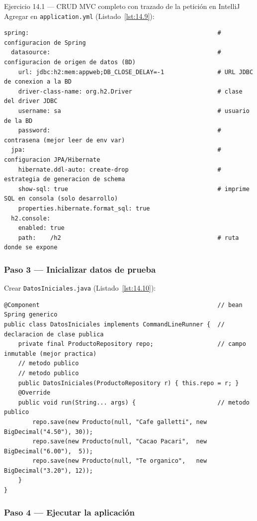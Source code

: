 \documentclass[11pt,a4paper,openany]{book}
\begin{document}
\begin{cajaejercicio}{Ejercicio 14.1 --- CRUD MVC completo con trazado de la petición en IntelliJ}
Agregar en \texttt{application.yml} (Listado~\ref{lst:14.9}):
\begin{lstlisting}[style=yaml,numbers=none,caption={Ejemplo de YAML},label=lst:14.9]
spring:                                                     # configuracion de Spring
  datasource:                                               # configuracion de origen de datos (BD)
    url: jdbc:h2:mem:appweb;DB_CLOSE_DELAY=-1               # URL JDBC de conexion a la BD
    driver-class-name: org.h2.Driver                        # clase del driver JDBC
    username: sa                                            # usuario de la BD
    password:                                               # contrasena (mejor leer de env var)
  jpa:                                                      # configuracion JPA/Hibernate
    hibernate.ddl-auto: create-drop                         # estrategia de generacion de schema
    show-sql: true                                          # imprime SQL en consola (solo desarrollo)
    properties.hibernate.format_sql: true
  h2.console:
    enabled: true
    path:    /h2                                            # ruta donde se expone
\end{lstlisting}

\subsubsection*{Paso 3 --- Inicializar datos de prueba}

Crear \texttt{DatosIniciales.java} (Listado~\ref{lst:14.10}):
\begin{lstlisting}[style=java,numbers=none,caption={Ejemplo de Java},label=lst:14.10]
@Component                                                  // bean Spring generico
public class DatosIniciales implements CommandLineRunner {  // declaracion de clase publica
    private final ProductoRepository repo;                  // campo inmutable (mejor practica)
    // metodo publico
    // metodo publico
    public DatosIniciales(ProductoRepository r) { this.repo = r; }
    @Override
    public void run(String... args) {                       // metodo publico
        repo.save(new Producto(null, "Cafe galletti", new BigDecimal("4.50"), 30));
        repo.save(new Producto(null, "Cacao Pacari",  new BigDecimal("6.00"),  5));
        repo.save(new Producto(null, "Te organico",   new BigDecimal("3.20"), 12));
    }
}
\end{lstlisting}

\subsubsection*{Paso 4 --- Ejecutar la aplicación}


\end{cajaejercicio}
\end{document}
